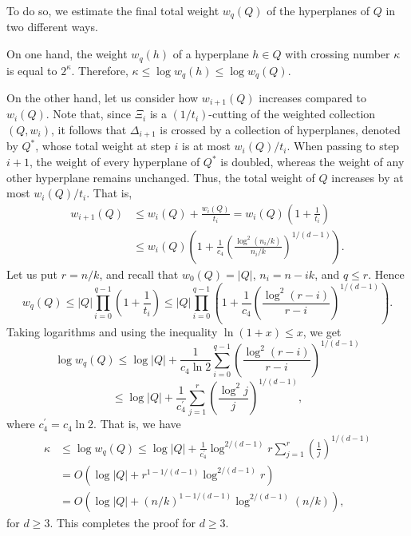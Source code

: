 \documentclass[11pt]{article}
\begin{document}
To do so, we estimate the final total weight $w_{q}(Q)$ of the hyperplanes of $Q$ in two different ways.

On one hand, the weight $w_{q}(h)$ of a hyperplane $h \in Q$ with crossing number $\kappa$ is equal to $2^{\kappa}$. Therefore, $\kappa  \leq \log w_{q}(h) \leq \log w_{q}(Q)$.

On the other hand, let us consider how $w_{i+1}(Q)$ increases compared to $w_{i}(Q)$. Note that, since $\Xi_{i}$ is a $(1/t_{i})$-cutting of the weighted collection $(Q,w_{i})$, it follows that $\Delta_{i+1}$ is crossed by a collection of hyperplanes, denoted by $Q^{*}$, whose total weight at step $i$ is at most $w_{i}(Q)/t_{i}$. When passing to step $i+1$, the weight of every hyperplane of $Q^{*}$ is doubled, whereas the weight of any other hyperplane remains unchanged. Thus, the total weight of $Q$ increases by at most $w_{i}(Q)/t_{i}$. That is,
\begin{align*}
w_{i+1}(Q) &\leq w_{i}(Q) + \frac{w_{i}(Q)}{t_{i}} = w_{i}(Q)\left(1 + \frac{1}{t_{i}} \right) \\
&\leq w_{i}(Q)\left(1 + \frac{1}{c_{4}} \left(\frac{\log^{2}(n_{i}/k)}{n_{i}/k} \right)^{1/(d-1)} \right).
\end{align*}
Let us put $r = n/k$, and recall that $w_{0}(Q) = |Q|$, $n_{i} = n - ik$, and $q \leq r$. Hence
$$
w_{q}(Q) \leq |Q|\prod_{i=0}^{q-1}\left(1 + \frac{1}{t_{i}} \right) \leq |Q|\prod_{i=0}^{q-1} \left(1 + \frac{1}{c_{4}} \left(\frac{\log^{2}(r-i)}{r-i}\right)^{1/(d-1)} \right).
$$
Taking logarithms and using the inequality $\ln(1+x) \leq x$, we get
$$
\log w_{q}(Q) \leq \log |Q| + \frac{1}{c_{4}\ln 2} \sum_{i=0}^{q-1}\left(\frac{\log^{2}(r-i)}{r-i}\right)^{1/(d-1)}
$$
\begin{equation} \label{eq_partition_step}
\leq \log |Q| + \frac{1}{c_{4}^{'}} \sum_{j=1}^{r}\left(\frac{\log^{2} j}{j}\right)^{1/(d-1)},
\end{equation}
where $c_{4}^{'} = c_{4}\ln 2$. That is, we have
\begin{align*}
\kappa & \leq \log w_{q}(Q) \leq \log|Q| + \frac{1}{c_{4}^{'}}\log^{2/(d-1)}r \sum_{j=1}^{r}\left(\frac{1}{j}\right)^{1/(d-1)} \\
& = O\left(\log|Q| + r^{1-1/(d-1)} \log^{2/(d-1)}r\right) \\
& = O \left(\log |Q| + (n/k)^{1 - 1/(d-1)} \log^{2/(d-1)}(n/k)\right),
\end{align*}
for $d \geq 3$. This completes the proof for $d \geq 3$.
\end{document}
